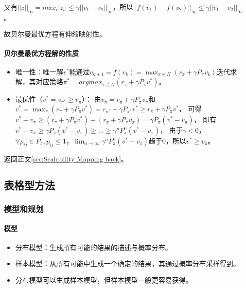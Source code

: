 \documentclass[
12pt, %
a4paper, 
oneside, %
headinclude,footinclude, %
]{scrartcl}
\begin{document}
又有$ ||z||_\infty = max_i |z_i| \leq \gamma ||v_1 - v_2||_\infty $，所以$ ||f(v_1) - f(v_2)||_\infty \leq \gamma ||v_1 - v_2||_\infty $。

故贝尔曼最优方程有伸缩映射性。
\paragraph{贝尔曼最优方程解的性质}
\begin{itemize}
\item 唯一性：唯一解$ v^* $能通过$ v_{k + 1} = f(v_k) = \max_{\pi \in \Pi} (r_\pi + \gamma P_\pi v_k) $迭代求解，其对应策略$ \pi^* = argmax_{\pi \in \Pi} (r_\pi + \gamma P_\pi v^*) $。
\item 最优性（$ v^* = v_{\pi^*} \geq v_{\pi} $）：
由$ v_{\pi} = r_{\pi} + \gamma P_{\pi} v_{\pi} $和$ v^* = \max_{\pi} (r_{\pi} + \gamma P_{\pi} v^*) = r_{\pi^*} + \gamma P_{\pi^*} v^* \geq r_{\pi} + \gamma P_{\pi} v^* $，
可得$ v^* - v_{\pi} \geq (r_{\pi} + \gamma P_{\pi} v^*) - (r_{\pi} + \gamma P_{\pi} v_{\pi}) = \gamma P_{\pi} (v^* - v_{\pi}) $，
即有$ v^* - v_{\pi} \geq \gamma P_{\pi} (v^* - v_{\pi}) \geq \dots \geq \gamma^n P_{\pi}^n (v^* - v_{\pi}) $，
由于$ \gamma < 0 $，$ \forall p_{ij} \in P_{\pi}, p_{ij} \leq 1 $，$ \lim_{n \to \infty} \gamma^n P_{\pi}^n (v^* - v_{\pi}) $趋于0，所以$ v^* \geq v_{\pi} $。
\end{itemize}

返回正文\ref{sec:Scalability Mapping back}。
\subsection{表格型方法}\label{sec:table}
\subsubsection{模型和规划}
\paragraph{模型}
\begin{itemize}
\item 分布模型：生成所有可能的结果的描述与概率分布。
\item 样本模型：从所有可能中生成一个确定的结果，其通过概率分布采样得到。
\item 分布模型可以生成样本模型，但样本模型一般更容易获得。
\end{itemize}
\end{document}
